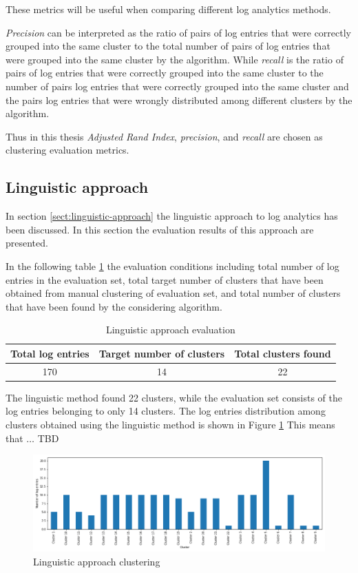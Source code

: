 \documentclass[thesis=M,english]{FITthesis}[2019/12/23]
\begin{document}
These metrics will be useful when comparing different log analytics methods.

\textit{Precision} can be interpreted as the ratio of pairs of log entries that were correctly grouped into the same cluster to the total number of pairs of log entries that were grouped into the same cluster by the algorithm.
While \textit{recall} is the ratio of pairs of log entries that were correctly grouped into the same cluster to the number of pairs log entries that were correctly grouped into the same cluster and the pairs log entries that were wrongly distributed among different clusters by the algorithm.

Thus in this thesis \textit{Adjusted Rand Index}, \textit{precision}, and \textit{recall} are chosen as clustering evaluation metrics.
\subsection{Linguistic approach}
In section \ref{sect:linguistic-approach} the linguistic approach to log analytics has been discussed. In this section the evaluation results of this approach are presented.

In the following table \ref{tab:evaluation-conditions-ling} the evaluation conditions including total number of log entries in the evaluation set, total target number of clusters that have been obtained from manual clustering of evaluation set, and total number of clusters that have been found by the considering algorithm.

\begin{table}[h!]\centering
	\caption{Linguistic approach evaluation}\label{tab:evaluation-conditions-ling}
	\begin{tabular}{ |c|c|c| }
		\hline
		\textbf{Total log entries} & \textbf{Target number of clusters} & \textbf{Total clusters found}\\
		\hline
		170 & 14 & 22 \\
		\hline
	\end{tabular}
\end{table}

The linguistic method found 22 clusters, while the evaluation set consists of the log entries belonging to only 14 clusters. The log entries distribution among clusters obtained using the linguistic method is shown in Figure \ref{fig:eval-clustering-ling} This means that $\dots$ TBD

\begin{figure}[h!]\centering
	\includegraphics[scale=0.34]{nlp_eval}
	\caption{Linguistic approach clustering}\label{fig:eval-clustering-ling}
\end{figure}
\end{document}
